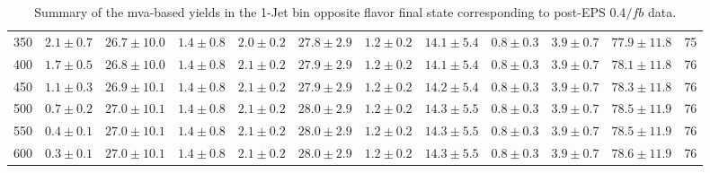 \begin{table}
{\begin{center}
\begin{tabular}{l c c c c c c c c c c c }
350 & $2.1\pm0.7$ & $26.7\pm10.0$ & $1.4\pm0.8$ & $2.0\pm0.2$ & $27.8\pm2.9$ & $1.2\pm0.2$ & $14.1\pm5.4$ & $0.8\pm0.3$ & $3.9\pm0.7$ & $77.9\pm11.8$ & 75 \\
400 & $1.7\pm0.5$ & $26.8\pm10.0$ & $1.4\pm0.8$ & $2.1\pm0.2$ & $27.9\pm2.9$ & $1.2\pm0.2$ & $14.1\pm5.4$ & $0.8\pm0.3$ & $3.9\pm0.7$ & $78.1\pm11.8$ & 76 \\
450 & $1.1\pm0.3$ & $26.9\pm10.1$ & $1.4\pm0.8$ & $2.1\pm0.2$ & $27.9\pm2.9$ & $1.2\pm0.2$ & $14.2\pm5.4$ & $0.8\pm0.3$ & $3.9\pm0.7$ & $78.3\pm11.8$ & 76 \\
500 & $0.7\pm0.2$ & $27.0\pm10.1$ & $1.4\pm0.8$ & $2.1\pm0.2$ & $28.0\pm2.9$ & $1.2\pm0.2$ & $14.3\pm5.5$ & $0.8\pm0.3$ & $3.9\pm0.7$ & $78.5\pm11.9$ & 76 \\
550 & $0.4\pm0.1$ & $27.0\pm10.1$ & $1.4\pm0.8$ & $2.1\pm0.2$ & $28.0\pm2.9$ & $1.2\pm0.2$ & $14.3\pm5.5$ & $0.8\pm0.3$ & $3.9\pm0.7$ & $78.5\pm11.9$ & 76 \\
600 & $0.3\pm0.1$ & $27.0\pm10.1$ & $1.4\pm0.8$ & $2.1\pm0.2$ & $28.0\pm2.9$ & $1.2\pm0.2$ & $14.3\pm5.5$ & $0.8\pm0.3$ & $3.9\pm0.7$ & $78.6\pm11.9$ & 76 \\
\hline
\end{tabular}
\end{center}
}
\caption{Summary of the mva-based yields in the 1-Jet bin opposite flavor final state corresponding to post-EPS 0.4$/fb$ data.}
\end{table}
